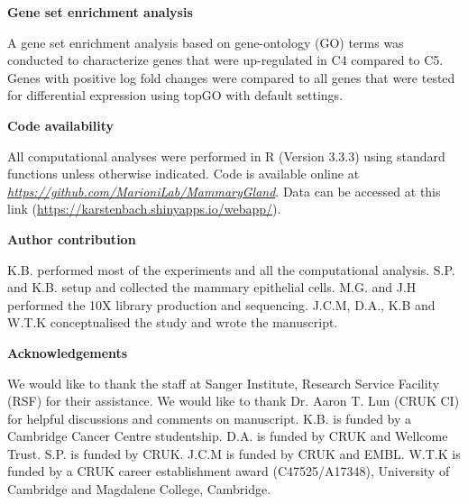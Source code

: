 \documentclass[titlepage, 12pt, oneside]{amsart}
\begin{document}
\textbf{Gene set enrichment analysis}

A gene set enrichment analysis based on gene-ontology (GO) terms was conducted to characterize genes that were up-regulated in C4 compared to C5.
Genes with positive log fold changes were compared to all genes that were tested for differential expression using topGO with default settings\autocite{Alexa2016}.

\textbf{Code availability}

All computational analyses were performed in R (Version 3.3.3) using standard functions unless otherwise indicated.
Code is available online at \href{https://github.com/MarioniLab/MammaryGland}{\textit{https://github.com/MarioniLab/MammaryGland}}.
Data can be accessed at this link (\url{https://karstenbach.shinyapps.io/webapp/}).

\textbf{Author contribution}

K.B. performed most of the experiments and all the computational analysis.
S.P. and K.B. setup and collected the mammary epithelial cells.
M.G. and J.H performed the 10X library production and sequencing.
J.C.M, D.A., K.B and W.T.K conceptualised the study and wrote the manuscript.

\textbf{Acknowledgements }

We would like to thank the staff at Sanger Institute, Research Service Facility (RSF) for their assistance.
We would like to thank Dr. Aaron T. Lun (CRUK CI) for helpful discussions and comments on manuscript.
K.B. is funded by a Cambridge Cancer Centre studentship.
D.A. is funded by CRUK and Wellcome Trust.
S.P. is funded by CRUK.
J.C.M is funded by CRUK and EMBL.
W.T.K is funded by a CRUK career establishment award (C47525/A17348), University of Cambridge and Magdalene College, Cambridge.

\printbibliography
\end{document}
